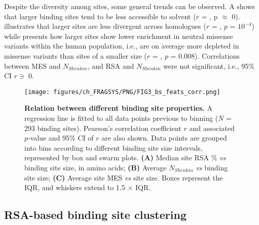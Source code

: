 Despite the diversity among sites, some general trends can be observed. A shows that larger binding sites tend to be less accessible to solvent ($r$ = , p $\approx$ 0).  illustrates that larger sites are less divergent across homologues ($r$ = , $p$ = $10^{-4}$) while  presents how larger sites show lower enrichment in neutral missense variants within the human population, i.e., are on average more depleted in missense variants than sites of a smaller size ($r$ = , $p$ = 0.008). Correlations between MES and $N_{Shenkin}$, and RSA and $N_{Shenkin}$ were not significant, i.e., 95\% CI $r \ni$ 0.

\begin{figure}[ht!]
    \centering
    \texttt{[image: figures/ch\_FRAGSYS/PNG/FIG3\_bs\_feats\_corr.png]}
    \caption[Relation between different binding site properties]{\textbf{Relation between different binding site properties.} A regression line is fitted to all data points previous to binning ($N$ = 293 binding sites). Pearson’s correlation coefficient $r$ \cite{RODGERS_1988_CORRELATION} and associated $p$-value and 95\% CI of $r$ \cite{BOWLEY_1928_R_CI} are also shown. Data points are grouped into bins according to different binding site size intervals, represented by box and swarm plots. \textbf{(A)} Median site RSA \% \textit{vs} binding site size, in amino acids; \textbf{(B)} Average $N_{Shenkin}$ \textit{vs} binding site size; \textbf{(C)} Average site MES \textit{vs} site size. Boxes represent the IQR, and whiskers extend to 1.5 $\times$ IQR.}
    \label{fig:bss_feats_corr}
\end{figure}

\subsection{RSA-based binding site clustering}

